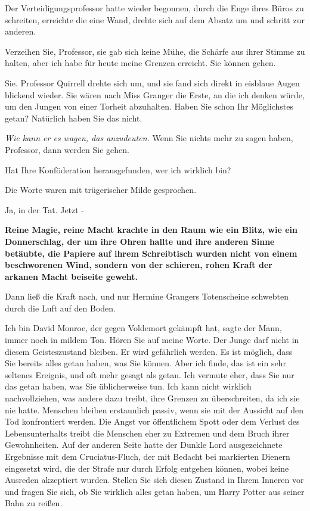 Der Verteidigungsprofessor hatte wieder begonnen, durch die Enge ihres Büros zu
schreiten, erreichte die eine Wand, drehte sich auf dem Absatz um und schritt
zur anderen.

\glqq Verzeihen Sie, Professor\grqq{}, sie gab sich keine Mühe, die Schärfe aus
ihrer Stimme zu halten, \glqq aber ich habe für heute meine Grenzen erreicht.
Sie können gehen.\grqq{}

\glqq Sie.\grqq{} Professor Quirrell drehte sich um, und sie fand sich direkt in
eisblaue Augen blickend wieder. \glqq Sie wären nach Miss Granger die Erste, an
die ich denken würde, um den Jungen von einer Torheit abzuhalten. Haben Sie
schon Ihr Möglichstes getan? Natürlich haben Sie das nicht.\grqq{}

\emph{Wie kann er es wagen, das anzudeuten.}
\glqq Wenn Sie nichts mehr zu sagen haben, Professor, dann werden Sie
gehen.\grqq{}

\glqq Hat Ihre Konföderation herausgefunden, wer ich wirklich bin?\grqq{}

Die Worte waren mit trügerischer Milde gesprochen.

\glqq Ja, in der Tat. Jetzt -\grqq{}

\textbf{Reine Magie, reine Macht krachte in den Raum wie ein Blitz, wie ein
Donnerschlag, der um ihre Ohren hallte und ihre anderen Sinne betäubte, die
Papiere auf ihrem Schreibtisch wurden nicht von einem beschworenen Wind, sondern
von der schieren, rohen Kraft der arkanen Macht beiseite geweht.}

Dann ließ die Kraft nach, und nur Hermine Grangers Totenscheine schwebten durch
die Luft auf den Boden.

\glqq Ich bin David Monroe, der gegen Voldemort gekämpft hat\grqq{}, sagte der
Mann, immer noch in mildem Ton. \glqq Hören Sie auf meine Worte. Der Junge darf
nicht in diesem Geisteszustand bleiben. Er wird gefährlich werden. Es ist
möglich, dass Sie bereits alles getan haben, was Sie können. Aber ich finde, das
ist ein sehr seltenes Ereignis, und oft mehr gesagt als getan. Ich vermute eher,
dass Sie nur das getan haben, was Sie üblicherweise tun. Ich kann nicht wirklich
nachvollziehen, was andere dazu treibt, ihre Grenzen zu überschreiten, da ich
sie nie hatte. Menschen bleiben erstaunlich passiv, wenn sie mit der Aussicht
auf den Tod konfrontiert werden. Die Angst vor öffentlichem Spott oder dem
Verlust des Lebensunterhalts treibt die Menschen eher zu Extremen und dem Bruch
ihrer Gewohnheiten. Auf der anderen Seite hatte der Dunkle Lord ausgezeichnete
Ergebnisse mit dem Cruciatus-Fluch, der mit Bedacht bei markierten Dienern
eingesetzt wird, die der Strafe nur durch Erfolg entgehen können, wobei keine
Ausreden akzeptiert wurden. Stellen Sie sich diesen Zustand in Ihrem Inneren vor
und fragen Sie sich, ob Sie wirklich alles getan haben, um Harry Potter aus
seiner Bahn zu reißen.\grqq{}

